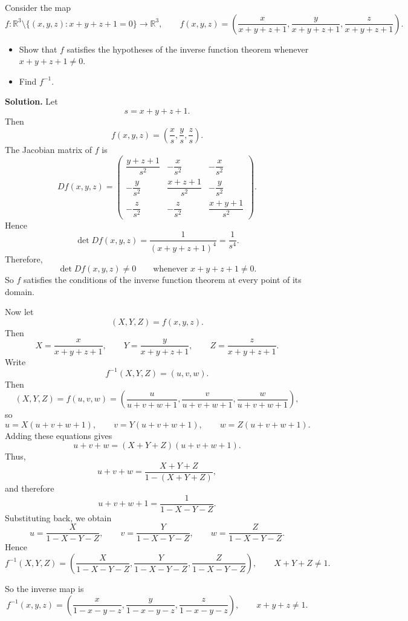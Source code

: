 \begin{example}
Consider the map
\[
f:\mathbb{R}^3\setminus\{(x,y,z):x+y+z+1=0\}\to\mathbb{R}^3,
\qquad
f(x,y,z)=\left(\frac{x}{x+y+z+1},\frac{y}{x+y+z+1},\frac{z}{x+y+z+1}\right).
\]

\begin{itemize}
    \item Show that \(f\) satisfies the hypotheses of the inverse function theorem whenever \(x+y+z+1\neq 0\).
    \item Find \(f^{-1}\).
\end{itemize}

\textbf{Solution.}
Let
\[
s=x+y+z+1.
\]
Then
\[
f(x,y,z)=\left(\frac{x}{s},\frac{y}{s},\frac{z}{s}\right).
\]
The Jacobian matrix of \(f\) is
\[
Df(x,y,z)=
\begin{pmatrix}
\dfrac{y+z+1}{s^2} & -\dfrac{x}{s^2} & -\dfrac{x}{s^2}\\[1.2ex]
-\dfrac{y}{s^2} & \dfrac{x+z+1}{s^2} & -\dfrac{y}{s^2}\\[1.2ex]
-\dfrac{z}{s^2} & -\dfrac{z}{s^2} & \dfrac{x+y+1}{s^2}
\end{pmatrix}.
\]
Hence
\[
\det Df(x,y,z)=\frac{1}{(x+y+z+1)^4}=\frac{1}{s^4}.
\]
Therefore,
\[
\det Df(x,y,z)\neq 0 \qquad \text{whenever } x+y+z+1\neq 0.
\]
So \(f\) satisfies the conditions of the inverse function theorem at every point of its domain.

Now let
\[
(X,Y,Z)=f(x,y,z).
\]
Then
\[
X=\frac{x}{x+y+z+1},\qquad
Y=\frac{y}{x+y+z+1},\qquad
Z=\frac{z}{x+y+z+1}.
\]
Write
\[
f^{-1}(X,Y,Z)=(u,v,w).
\]
Then
\[
(X,Y,Z)=f(u,v,w)
=
\left(
\frac{u}{u+v+w+1},
\frac{v}{u+v+w+1},
\frac{w}{u+v+w+1}
\right),
\]
so
\[
u=X(u+v+w+1),\qquad
v=Y(u+v+w+1),\qquad
w=Z(u+v+w+1).
\]
Adding these equations gives
\[
u+v+w=(X+Y+Z)(u+v+w+1).
\]
Thus,
\[
u+v+w=\frac{X+Y+Z}{1-(X+Y+Z)},
\]
and therefore
\[
u+v+w+1=\frac{1}{1-X-Y-Z}.
\]
Substituting back, we obtain
\[
u=\frac{X}{1-X-Y-Z},\qquad
v=\frac{Y}{1-X-Y-Z},\qquad
w=\frac{Z}{1-X-Y-Z}.
\]
Hence
\[
f^{-1}(X,Y,Z)
=
\left(
\frac{X}{1-X-Y-Z},
\frac{Y}{1-X-Y-Z},
\frac{Z}{1-X-Y-Z}
\right),
\qquad X+Y+Z\neq 1.
\]

So the inverse map is
\[
f^{-1}(x,y,z)
=
\left(
\frac{x}{1-x-y-z},
\frac{y}{1-x-y-z},
\frac{z}{1-x-y-z}
\right),
\qquad x+y+z\neq 1.
\]
\end{example}

